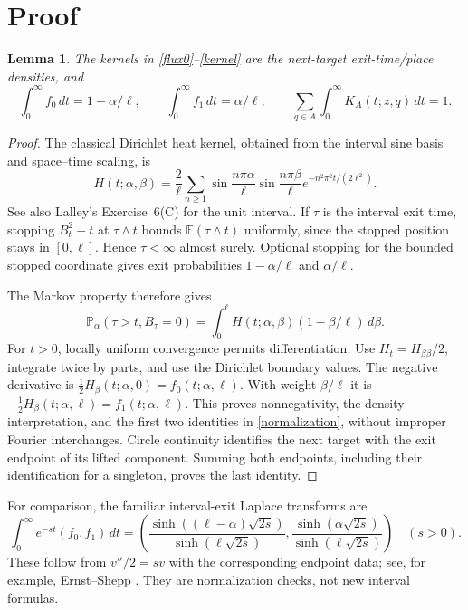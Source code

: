 \documentclass[11pt]{article}
\newtheorem{lemma}{Lemma}
\newcommand{\E}{\mathbb E}
\newcommand{\Prob}{\mathbb P}
\begin{document}
\section{Proof}
\begin{lemma}\label{exit}
The kernels in \eqref{flux0}--\eqref{kernel} are the next-target
exit-time/place densities, and
\begin{equation}\label{normalization}
 \int_0^\infty f_0\,dt=1-\alpha/\ell,\qquad
 \int_0^\infty f_1\,dt=\alpha/\ell,\qquad
 \sum_{q\in A}\int_0^\infty K_A(t;z,q)\,dt=1.
\end{equation}
\end{lemma}
\begin{proof}
The classical Dirichlet heat kernel, obtained from the interval sine
basis and space--time scaling, is
\begin{equation}\label{heat}
 H(t;\alpha,\beta)=\frac2\ell\sum_{n\geq1}
 \sin\frac{n\pi\alpha}{\ell}\sin\frac{n\pi\beta}{\ell}
 e^{-n^2\pi^2t/(2\ell^2)}.
\end{equation}
See also Lalley's Exercise~6(C) \cite{Lalley} for the unit interval.
If $\tau$ is the interval exit time, stopping $B_t^2-t$ at
$\tau\wedge t$ bounds $\E(\tau\wedge t)$ uniformly, since the stopped
position stays in $[0,\ell]$. Hence $\tau<\infty$ almost surely.
Optional stopping for the bounded stopped coordinate gives exit
probabilities $1-\alpha/\ell$ and $\alpha/\ell$.

The Markov property therefore gives
\[
 \Prob_\alpha(\tau>t,B_\tau=0)
    =\int_0^\ell H(t;\alpha,\beta)(1-\beta/\ell)\,d\beta.
\]
For $t>0$, locally uniform convergence permits differentiation.
Use $H_t=H_{\beta\beta}/2$, integrate twice by parts, and use the
Dirichlet boundary values. The negative derivative is
$\tfrac12H_\beta(t;\alpha,0)=f_0(t;\alpha,\ell)$.
With weight $\beta/\ell$ it is
$-\tfrac12H_\beta(t;\alpha,\ell)=f_1(t;\alpha,\ell)$.
This proves nonnegativity, the density interpretation, and the first
two identities in \eqref{normalization}, without improper Fourier
interchanges. Circle continuity identifies the next target with the
exit endpoint of its lifted component. Summing both endpoints,
including their identification for a singleton, proves the last identity.
\end{proof}

For comparison, the familiar interval-exit Laplace transforms are
\begin{equation}\label{exitlaplace}
 \int_0^\infty e^{-st}(f_0,f_1)\,dt
 =\left(\frac{\sinh((\ell-\alpha)\sqrt{2s})}
                   {\sinh(\ell\sqrt{2s})},
        \frac{\sinh(\alpha\sqrt{2s})}
                   {\sinh(\ell\sqrt{2s})}\right)\quad(s>0).
\end{equation}
These follow from $v''/2=sv$ with the corresponding endpoint data;
see, for example, Ernst--Shepp \cite{ErnstShepp}. They are normalization
checks, not new interval formulas.
\end{document}
